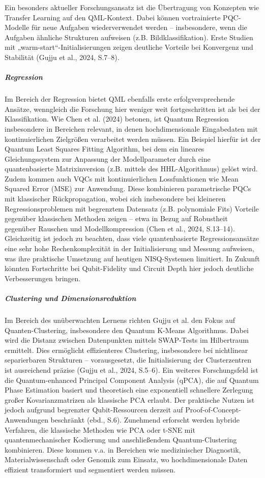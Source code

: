Ein besonders aktueller Forschungsansatz ist die Übertragung von Konzepten wie Transfer Learning auf den QML-Kontext. Dabei können vortrainierte PQC-Modelle für neue Aufgaben wiederverwendet werden – insbesondere, wenn die Aufgaben ähnliche Strukturen aufweisen (z.B. Bildklassifikation). Erste Studien mit „warm-start“-Initialisierungen zeigen deutliche Vorteile bei Konvergenz und Stabilität (Gujju et al., 2024, S.7–8).

\subparagraph{Regression}
Im Bereich der Regression bietet QML ebenfalls erste erfolgversprechende Ansätze, wenngleich die Forschung hier weniger weit fortgeschritten ist als bei der Klassifikation. Wie Chen et al. (2024) betonen, ist Quantum Regression insbesondere in Bereichen relevant, in denen hochdimensionale Eingabedaten mit kontinuierlichen Zielgrößen verarbeitet werden müssen. Ein Beispiel hierfür ist der Quantum Least Squares Fitting Algorithm, bei dem ein lineares Gleichungssystem zur Anpassung der Modellparameter durch eine quantenbasierte Matrixinversion (z.B. mittels des HHL-Algorithmus) gelöst wird.
Zudem kommen auch VQCs mit kontinuierlichen Lossfunktionen wie Mean Squared Error (MSE) zur Anwendung. Diese kombinieren parametrische PQCs mit klassischer Rückpropagation, wobei sich insbesondere bei kleineren Regressionsproblemen mit begrenztem Datensatz (z.B. polynomiale Fits) Vorteile gegenüber klassischen Methoden zeigen – etwa in Bezug auf Robustheit gegenüber Rauschen und Modellkompression (Chen et al., 2024, S.13–14).
Gleichzeitig ist jedoch zu beachten, dass viele quantenbasierte Regressionsansätze eine sehr hohe Rechenkomplexität in der Initialisierung und Messung aufweisen, was ihre praktische Umsetzung auf heutigen NISQ-Systemen limitiert. In Zukunft könnten Fortschritte bei Qubit-Fidelity und Circuit Depth hier jedoch deutliche Verbesserungen bringen.

\subparagraph{Clustering und Dimensionsreduktion}
Im Bereich des unüberwachten Lernens richten Gujju et al. den Fokus auf Quanten-Clustering, insbesondere den Quantum K-Means Algorithmus. Dabei wird die Distanz zwischen Datenpunkten mittels SWAP-Tests im Hilbertraum ermittelt. Dies ermöglicht effizienteres Clustering, insbesondere bei nichtlinear separierbaren Strukturen – vorausgesetzt, die Initialisierung der Clusterzentren ist ausreichend präzise (Gujju et al., 2024, S.5–6).
Ein weiteres Forschungsfeld ist die Quantum-enhanced Principal Component Analysis (qPCA), die auf Quantum Phase Estimation basiert und theoretisch eine exponentiell schnellere Zerlegung großer Kovarianzmatrizen als klassische PCA erlaubt. Der praktische Nutzen ist jedoch aufgrund begrenzter Qubit-Ressourcen derzeit auf Proof-of-Concept-Anwendungen beschränkt (ebd., S.6).
Zunehmend erforscht werden hybride Verfahren, die klassische Methoden wie PCA oder t-SNE mit quantenmechanischer Kodierung und anschließendem Quantum-Clustering kombinieren. Diese kommen v.a. in Bereichen wie medizinischer Diagnostik, Materialwissenschaft oder Genomik zum Einsatz, wo hochdimensionale Daten effizient transformiert und segmentiert werden müssen.

